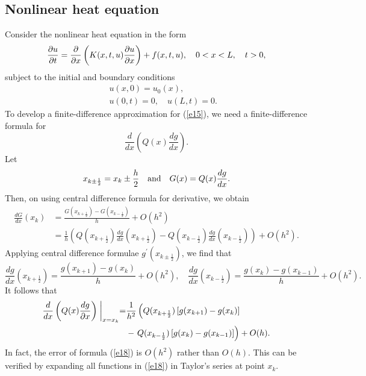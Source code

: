 %
%
%


\subsection{Nonlinear heat equation}

Consider the nonlinear heat equation in the form
\begin{equation}
\frac{{\partial} u}{{\partial} t} =\frac{{\partial} }{{\partial} x}\left(K(x,t,u)
\frac{{\partial} u}{{\partial} x}\right)+f(x,t,u),  \quad 0<x< L, \quad t>0, \label{e15}
\end{equation}
subject to the initial and boundary conditions
\begin{eqnarray}
&&u(x, 0) = u_{0}(x), \label{e16} \\
&&u(0,t)=0, \quad u(L,t)=0.   \label{e17}
\end{eqnarray}
To develop a finite-difference approximation for (\ref{e15}), we need
a finite-difference formula for
\[
\frac{d }{d x}\left(Q(x)
\frac{d g}{d x}\right).
\]
Let
\[
x_{k\pm\frac{1}{2}}=x_{k}\pm \frac{h}{2} \quad {\rm and} \quad
G(x)=Q(x)\frac{d g}{d x}.
\]
Then, on using central difference formula for derivative, we obtain
\[\begin{split}
\frac{dG}{dx}(x_{k})&=\frac{G(x_{k+\frac{1}{2}})-G(x_{k-\frac{1}{2}})}{h}+O(h^2)\\&=
\frac{1}{h}\left(
Q(x_{k+\frac{1}{2}})\frac{dg}{dx}(x_{k+\frac{1}{2}})
-Q(x_{k-\frac{1}{2}})\frac{dg}{dx}(x_{k-\frac{1}{2}})\right)+O(h^2).
\end{split}\]
Applying central difference formulae $g^{\prime}(x_{k\pm\frac{1}{2}})$, we find that
\[
\frac{dg}{dx}(x_{k+\frac{1}{2}})=\frac{g(x_{k+1})-g(x_{k})}{h}+O(h^2), \quad
\frac{dg}{dx}(x_{k-\frac{1}{2}})=\frac{g(x_{k})-g(x_{k-1})}{h}+O(h^2).
\]
It follows that
\begin{equation}\begin{split}
\frac{d }{d x}\left(Q(x)
\frac{d g}{{\partial} x}\right)\biggm\vert_{x=x_{k}}=&\frac{1}{h^2}
\left(Q(x_{k+\frac{1}{2}})\left[g(x_{k+1})-g(x_{k})\right]\right.\\&-
\left.Q(x_{k-\frac{1}{2}})\left[g(x_{k})-g(x_{k-1})\right]\right) +O(h).\label{e18}
\end{split}\end{equation}
In fact, the error of formula (\ref{e18}) is $O(h^2)$ rather than $O(h)$. This can be verified
by expanding all functions in (\ref{e18}) in Taylor's series at point $x_{k}$.

